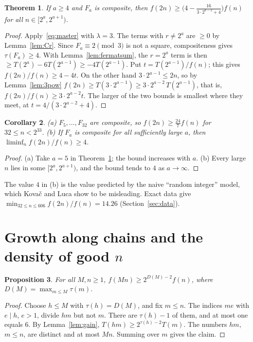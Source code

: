 \documentclass[11pt]{amsart}
\newtheorem{theorem}{Theorem}[section]
\newtheorem{proposition}[theorem]{Proposition}
\newtheorem{corollary}[theorem]{Corollary}
\theoremstyle{definition}
\theoremstyle{remark}
\begin{document}
\begin{theorem}\label{thm:fermat}
If $a\ge4$ and $F_a$ is composite, then $f(2n)\ge\bigl(4-\frac{16}{3\cdot2^{a-2}+4}\bigr)f(n)$ for all
$n\in[2^a,2^{a+1})$.
\end{theorem}
\begin{proof}
Apply~\eqref{eq:master} with $\lambda=3$. The terms with $r\ne2^a$ are $\ge0$ by Lemma~\ref{lem:Cr}.
Since $F_a\equiv2\pmod3$ is not a square, compositeness gives $\tau(F_a)\ge4$. With Lemma~\ref{lem:fermatsum}, the
$r=2^a$ term is then $\ge T(2^a)-6T(2^{a-1})\ge-4T(2^{a-1})$. Put $t=T(2^{a-1})/f(n)$; this gives
$f(2n)/f(n)\ge4-4t$. On the other hand $3\cdot2^{a-1}\le2n$, so by Lemma~\ref{lem:3pow}
$f(2n)\ge T(3\cdot2^{a-1})\ge3\cdot2^{a-2}\,T(2^{a-1})$, that is, $f(2n)/f(n)\ge3\cdot2^{a-2}t$. The larger of the two
bounds is smallest where they meet, at $t=4/(3\cdot2^{a-2}+4)$.
\end{proof}

\begin{corollary}\label{cor:fermat}
(a) $F_5,\dots,F_{32}$ are composite, so $f(2n)\ge\frac{24}{7}f(n)$ for $32\le n<2^{33}$.
(b) If $F_a$ is composite for all sufficiently large $a$, then $\liminf_{n}f(2n)/f(n)\ge4$.
\end{corollary}
\begin{proof}
(a) Take $a=5$ in Theorem~\ref{thm:fermat}; the bound increases with $a$. (b) Every large $n$ lies in some
$[2^a,2^{a+1})$, and the bound tends to $4$ as $a\to\infty$.
\end{proof}

The value $4$ in (b) is the value predicted by the naive ``random integer'' model, which Kova\v{c} and Luca show to be misleading.
Exact data give $\min_{32\le n\le606}f(2n)/f(n)=14.26$ (Section~\ref{sec:data}).

\section{Growth along chains and the density of good \texorpdfstring{$n$}{n}}

\begin{proposition}\label{prop:mult}
For all $M,n\ge1$, $f(Mn)\ge2^{D(M)-2}f(n)$, where $D(M)=\max_{m\le M}\tau(m)$.
\end{proposition}
\begin{proof}
Choose $h\le M$ with $\tau(h)=D(M)$, and fix $m\le n$. The indices $me$ with $e\mid h$, $e>1$, divide $hm$ but not $m$.
There are $\tau(h)-1$ of them, and at most one equals $6$. By Lemma~\ref{lem:gain}, $T(hm)\ge2^{\tau(h)-2}T(m)$.
The numbers $hm$, $m\le n$, are distinct and at most $Mn$. Summing over $m$ gives the claim.
\end{proof}
\end{document}
